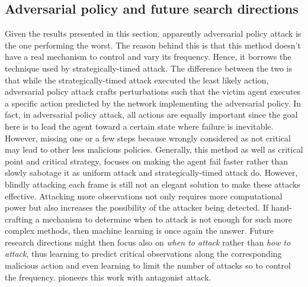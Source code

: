 \subsection{Adversarial policy and future search directions}
Given the results presented in this section, apparently adversarial policy attack is the one performing the worst. The reason behind this is that this method doesn't have a real mechanism to control and vary its frequency. Hence, it borrows the technique used by strategically-timed attack. The difference between the two is that while the strategically-timed attack executed the least likely action, adversarial policy attack crafts perturbations such that the victim agent executes a specific action predicted by the network implementing the adversarial policy. In fact, in adversarial policy attack, all actions are equally important since the goal here is to lead the agent toward a certain state where failure is inevitable. However, missing one or a few steps because wrongly considered as not critical may lead to other less malicious policies. Generally, this method as well as critical point and critical strategy, focuses on making the agent fail faster rather than slowly sabotage it as uniform attack and strategically-timed attack do. However, blindly attacking each frame is still not an elegant solution to make these attacks effective. Attacking more observations not only requires more computational power but also increases the possibility of the attacker being detected. If hand-crafting a mechanism to determine when to attack is not enough for such more complex methods, then machine learning is once again the answer. Future research directions might then focus also on {\it when to attack} rather than {\it how to attack}, thus learning to predict critical observations along the corresponding malicious action and even learning to limit the number of attacks so to control the frequency. \cite{sun2020stealthy} pioneers this work with antagonist attack.

